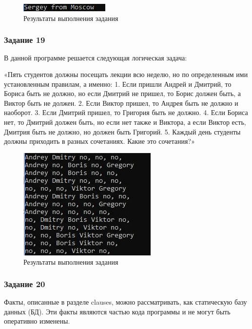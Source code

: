 \documentclass[14pt,a4paper,report]{report}
\begin{document}


\begin{figure}[h!]
	\centering
	\includegraphics[scale = 1.0]{images/d18.jpeg}
	\caption{Результаты выполнения задания}
\end{figure}

\subsubsection{Задание 19}

В данной программе решается следующая логическая задача:

«Пять студентов должны посещать лекции всю неделю, но по определенным ими установленным правилам, а именно:
1. Если пришли Андрей и Дмитрий, то Бориса быть не должно, но если Дмитрий не пришел, то Борис должен быть, а Виктор быть не должен.
2. Если Виктор пришел, то Андрея быть не должно и наоборот.
3. Если Дмитрий пришел, то Григория быть не должно.
4. Если Бориса нет, то Дмитрий должен быть, но если нет также и Виктора, а если Виктор есть, Дмитрия быть не должно, но должен быть Григорий.
5. Каждый день студенты должны приходить в разных сочетаниях.
Какие это сочетания?»



\begin{figure}[h!]
	\centering
	\includegraphics[scale = 1.0]{images/d19.jpeg}
	\caption{Результаты выполнения задания}
\end{figure}

\subsubsection{Задание 20}

Факты, описанные в разделе clauses, можно рассматривать, как статическую базу данных (БД). Эти факты являются частью кода программы и не могут быть оперативно изменены. 
\end{document}
